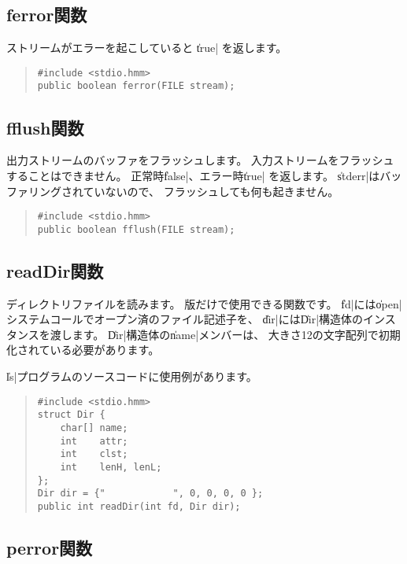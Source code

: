 \subsection{ferror関数}

ストリームがエラーを起こしていると \|true| を返します。

\begin{quote}
\begin{verbatim}
#include <stdio.hmm>
public boolean ferror(FILE stream);
\end{verbatim}
\end{quote}

\subsection{fflush関数}

出力ストリームのバッファをフラッシュします。
入力ストリームをフラッシュすることはできません。
正常時\|false|、エラー時\|true| を返します。
\|stderr|はバッファリングされていないので、
フラッシュしても何も起きません。

\begin{quote}
\begin{verbatim}
#include <stdio.hmm>
public boolean fflush(FILE stream);
\end{verbatim}
\end{quote}

\subsection{readDir関数}
\label{chap4:readDir}

ディレクトリファイルを読みます。
{\tacos}版だけで使用できる関数です。
\|fd|には\|open|システムコールでオープン済のファイル記述子を、
\|dir|には\|Dir|構造体のインスタンスを渡します。
\|Dir|構造体の\|name|メンバーは、
大きさ12の文字配列で初期化されている必要があります。

\|ls|プログラムのソースコードに使用例があります。

\begin{quote}
\begin{verbatim}
#include <stdio.hmm>
struct Dir {
    char[] name;
    int    attr;
    int    clst;
    int    lenH, lenL;
};
Dir dir = {"            ", 0, 0, 0, 0 };
public int readDir(int fd, Dir dir);
\end{verbatim}
\end{quote}

\subsection{perror関数}

